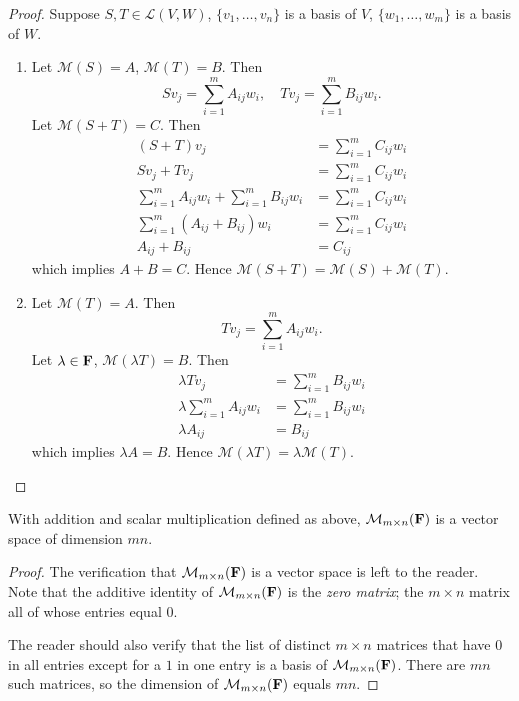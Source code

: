 \begin{proof}
Suppose $S,T\in\mathcal{L}(V,W)$, $\{v_1,\dots,v_n\}$ is a basis of $V$, $\{w_1,\dots,w_m\}$ is a basis of $W$.
\begin{enumerate}[label=(\roman*)]
\item Let $\mathcal{M}(S)=A$, $\mathcal{M}(T)=B$. Then
\[Sv_j=\sum_{i=1}^{m}A_{ij}w_i,\quad
Tv_j=\sum_{i=1}^{m}B_{ij}w_i.\]
Let $\mathcal{M}(S+T)=C$. Then
\begin{align*}
(S+T)v_j&=\sum_{i=1}^{m}C_{ij}w_i\\
Sv_j+Tv_j&=\sum_{i=1}^{m}C_{ij}w_i\\
\sum_{i=1}^{m}A_{ij}w_i+\sum_{i=1}^{m}B_{ij}w_i&=\sum_{i=1}^{m}C_{ij}w_i\\
\sum_{i=1}^{m}(A_{ij}+B_{ij})w_i&=\sum_{i=1}^{m}C_{ij}w_i\\
A_{ij}+B_{ij}&=C_{ij}
\end{align*}
which implies $A+B=C$. Hence $\mathcal{M}(S+T)=\mathcal{M}(S)+\mathcal{M}(T)$.

\item Let $\mathcal{M}(T)=A$. Then
\[Tv_j=\sum_{i=1}^{m}A_{ij}w_i.\]
Let $\lambda\in\mathbf F$, $\mathcal{M}(\lambda T)=B$. Then
\begin{align*}
\lambda Tv_j&=\sum_{i=1}^{m}B_{ij}w_i\\
\lambda\sum_{i=1}^{m}A_{ij}w_i&=\sum_{i=1}^{m}B_{ij}w_i\\
\lambda A_{ij}&=B_{ij}
\end{align*}
which implies $\lambda A=B$. Hence $\mathcal{M}(\lambda T)=\lambda\mathcal{M}(T)$.
\end{enumerate}
\end{proof}

\begin{lemma}
With addition and scalar multiplication defined as above, $\mathcal{M}_{m\times n}(\mathbf F)$ is a vector space of dimension $mn$.
\end{lemma}

\begin{proof}
The verification that $\mathcal{M}_{m\times n}(\mathbf F)$ is a vector space is left to the reader. Note that the additive identity of $\mathcal{M}_{m\times n}(\mathbf F)$ is the \emph{zero matrix}; the $m\times n$ matrix all of whose entries equal $0$.

The reader should also verify that the list of distinct $m\times n$ matrices that have $0$ in all entries except for a $1$ in one entry is a basis of $\mathcal{M}_{m\times n}(\mathbf F)$. There are $mn$ such matrices, so the dimension of $\mathcal{M}_{m\times n}(\mathbf F)$ equals $mn$.
\end{proof}
\pagebreak

